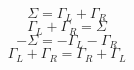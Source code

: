
\begin{equation}\label{e1}\Sigma = \Gamma_L + \Gamma_R\end{equation}
\begin{equation}\label{e2}\Gamma_L + \Gamma_R = \Sigma\end{equation}
\begin{equation}\label{e3}-\Sigma = -\Gamma_L - \Gamma_R\end{equation}
\begin{equation}\label{e4}\Gamma_L + \Gamma_R = \Gamma_R + \Gamma_L\end{equation}

